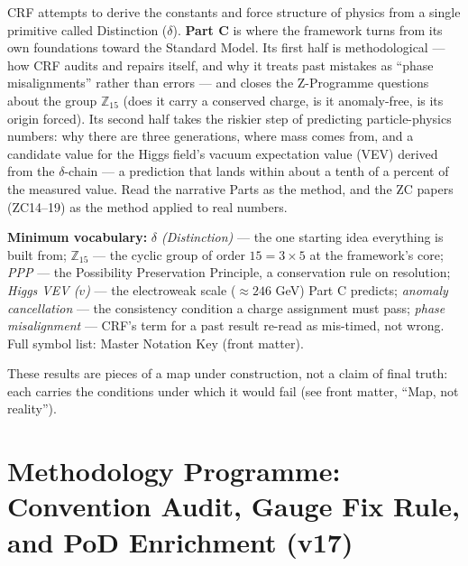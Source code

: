 \documentclass[12pt, a4paper]{article}
\begin{document}
\begin{keybox}[title={If you are just arriving --- Part C in plain language}]
\sloppy
CRF attempts to derive the constants and force structure of physics from a
single primitive called Distinction ($\delta$). \textbf{Part C} is where the
framework turns from its own foundations toward the Standard Model. Its first
half is methodological --- how CRF audits and repairs itself, and why it treats
past mistakes as ``phase misalignments'' rather than errors --- and closes the
Z-Programme questions about the group $\mathbb{Z}_{15}$ (does it carry a
conserved charge, is it anomaly-free, is its origin forced). Its second half
takes the riskier step of predicting particle-physics numbers: why there are
three generations, where mass comes from, and a candidate value for the Higgs
field's vacuum expectation value (VEV) derived from the $\delta$-chain --- a
prediction that lands within about a tenth of a percent of the measured value.
Read the narrative Parts as the method, and the ZC papers (ZC14–19) as the
method applied to real numbers.

\textbf{Minimum vocabulary:}
\textit{$\delta$ (Distinction)} --- the one starting idea everything is built
from;\;
\textit{$\mathbb{Z}_{15}$} --- the cyclic group of order $15=3\times5$ at the
framework's core;\;
\textit{PPP} --- the Possibility Preservation Principle, a conservation rule on
resolution;\;
\textit{Higgs VEV ($v$)} --- the electroweak scale ($\approx246$ GeV) Part C
predicts;\;
\textit{anomaly cancellation} --- the consistency condition a charge assignment
must pass;\;
\textit{phase misalignment} --- CRF's term for a past result re-read as
mis-timed, not wrong.
Full symbol list: Master Notation Key (front matter).

These results are pieces of a map under construction, not a claim of final
truth: each carries the conditions under which it would fail (see front
matter, ``Map, not reality'').
\end{keybox}

\clearpage

\part{Methodology Programme: Convention Audit, Gauge Fix Rule, and PoD Enrichment (v17)}
%
\end{document}
